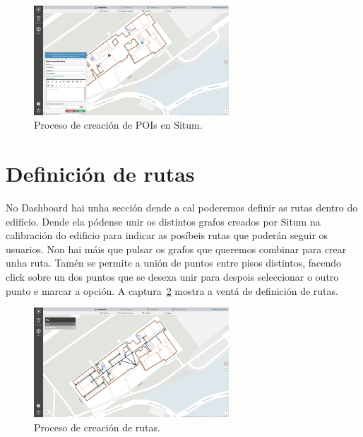 \begin{figure}[tbh] 
	\begin{center}
		\includegraphics[width=0.65\textwidth]{figures/Capturas/poi}
		\caption{Proceso de creación de POIs en Situm.}
		\label{fig:poi}
	\end{center}
\end{figure}

\section{Definición de rutas}
No Dashboard hai unha sección dende a cal poderemos definir as rutas dentro do edificio. Dende ela pódense unir os distintos grafos creados por Situm na calibración do edificio para indicar as posíbeis rutas que poderán seguir os usuarios. Non hai máis que pulsar os grafos que queremos combinar para crear unha ruta. Tamén se permite a unión de puntos entre pisos distintos, facendo click sobre un dos puntos que se desexa unir para despois seleccionar o outro punto e marcar a opción. A captura~\ref{fig:rutas} mostra a ventá de definición de rutas.

\begin{figure}[tbh] 
	\begin{center}
		\includegraphics[width=0.65\textwidth]{figures/Capturas/rutas}
		\caption{Proceso de creación de rutas.}
		\label{fig:rutas}
	\end{center}
\end{figure}